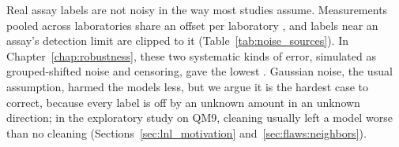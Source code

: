 Real assay labels are not noisy in the way most studies assume. Measurements pooled across laboratories share an offset per laboratory \citep{Bentz2013}, and labels near an assay's detection limit are clipped to it \citep{Svensson2025} (Table~\ref{tab:noise_sources}). In Chapter~\ref{chap:robustness}, these two systematic kinds of error, simulated as grouped-shifted noise and censoring, gave the lowest \aucnorm{}. Gaussian noise, the usual assumption, harmed the models less, but we argue it is the hardest case to correct, because every label is off by an unknown amount in an unknown direction; in the exploratory study on QM9, cleaning usually left a model worse than no cleaning (Sections~\ref{sec:lnl_motivation} and~\ref{sec:flaws:neighbors}).




